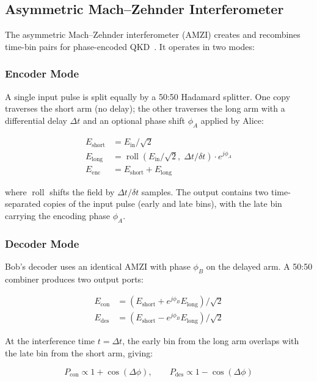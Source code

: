 \documentclass[11pt,a4paper]{article}
\begin{document}
\subsection{Asymmetric Mach--Zehnder Interferometer}

The asymmetric Mach--Zehnder interferometer (AMZI) creates and recombines
time-bin pairs for phase-encoded QKD~\cite{townsend}.  It operates in two
modes:

\subsubsection{Encoder Mode}

A single input pulse is split equally by a 50:50 Hadamard splitter.  One
copy traverses the short arm (no delay); the other traverses the long arm
with a differential delay $\Delta t$ and an optional phase shift
$\phi_A$ applied by Alice:

\begin{align}
  E_{\text{short}} &= E_{\text{in}} / \sqrt{2} \\
  E_{\text{long}} &= \operatorname{roll}(E_{\text{in}} / \sqrt{2},\;
    \Delta t / \delta t) \cdot e^{j\phi_A} \\
  E_{\text{enc}} &= E_{\text{short}} + E_{\text{long}}
\end{align}

where $\operatorname{roll}$ shifts the field by $\Delta t / \delta t$
samples.  The output contains two time-separated copies of the input
pulse (early and late bins), with the late bin carrying the encoding
phase $\phi_A$.

\subsubsection{Decoder Mode}

Bob's decoder uses an identical AMZI with phase $\phi_B$ on the delayed
arm.  A 50:50 combiner produces two output ports:

\begin{align}
  E_{\text{con}} &= (E_{\text{short}} + e^{j\phi_B} E_{\text{long}})
    / \sqrt{2} \\
  E_{\text{des}} &= (E_{\text{short}} - e^{j\phi_B} E_{\text{long}})
    / \sqrt{2}
\end{align}

At the interference time $t = \Delta t$, the early bin from the long arm
overlaps with the late bin from the short arm, giving:

\begin{equation}
  P_{\text{con}} \propto 1 + \cos(\Delta\phi),\qquad
  P_{\text{des}} \propto 1 - \cos(\Delta\phi)
  \label{eq:amzi-interference}
\end{equation}
\end{document}
